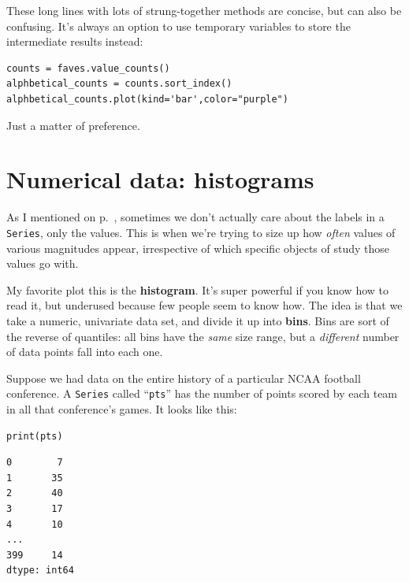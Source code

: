 These long lines with lots of strung-together methods are concise, but can also
be confusing. It's always an option to use temporary variables to store the
intermediate results instead:

\begin{Verbatim}[fontsize=\small,samepage=true,frame=single,framesep=3mm]
counts = faves.value_counts()
alphbetical_counts = counts.sort_index()
alphbetical_counts.plot(kind='bar',color="purple")
\end{Verbatim}

Just a matter of preference.

\section{Numerical data: histograms}


As I mentioned on p.~\pageref{twoWaysToPlotUnivariateData}, sometimes we don't
actually care about the labels in a \texttt{Series}, only the values. This is
when we're trying to size up how \textit{often} values of various magnitudes
appear, irrespective of which specific objects of study those values go with.


My favorite plot this is the \textbf{histogram}. It's super powerful if you
know how to read it, but underused because few people seem to know how. The
idea is that we take a numeric, univariate data set, and divide it up into
\textbf{bins}. Bins are sort of the reverse of quantiles: all bins have the
\textit{same} size range, but a \textit{different} number of data points fall
into each one.


Suppose we had data on the entire history of a particular NCAA football
conference. A \texttt{Series} called ``\texttt{pts}'' has the number of points
scored by each team in all that conference's games. It looks like this:

\begin{Verbatim}[fontsize=\small,samepage=true,frame=single,framesep=3mm]
print(pts)
\end{Verbatim}
\vspace{-.2in}

\begin{Verbatim}[fontsize=\small,samepage=true,frame=leftline,framesep=5mm,framerule=1mm]
0        7
1       35
2       40
3       17
4       10
...
399     14
dtype: int64
\end{Verbatim}

